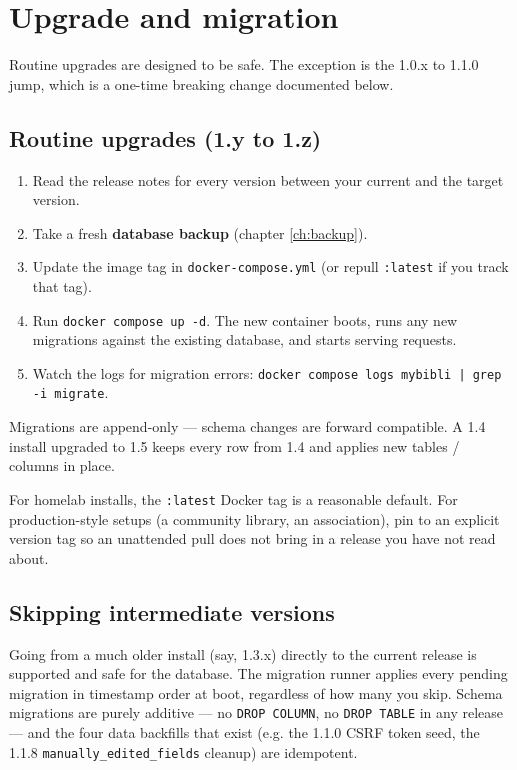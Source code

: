 \chapter{Upgrade and migration}
\label{ch:upgrade}

Routine upgrades are designed to be safe. The exception is the
1.0.x to 1.1.0 jump, which is a one-time breaking change documented
below.

\section{Routine upgrades (1.y to 1.z)}

\begin{enumerate}
  \item Read the release notes for every version between your
        current and the target version.
  \item Take a fresh \textbf{database backup} (chapter
        \ref{ch:backup}).
  \item Update the image tag in \texttt{docker-compose.yml} (or
        repull \texttt{:latest} if you track that tag).
  \item Run \texttt{docker compose up -d}. The new container boots,
        runs any new migrations against the existing database, and
        starts serving requests.
  \item Watch the logs for migration errors:
        \texttt{docker compose logs mybibli | grep -i migrate}.
\end{enumerate}

Migrations are append-only — schema changes are forward
compatible. A 1.4 install upgraded to 1.5 keeps every row from 1.4
and applies new tables / columns in place.

\begin{tip}
For homelab installs, the \texttt{:latest} Docker tag is a
reasonable default. For production-style setups (a community
library, an association), pin to an explicit version tag so an
unattended pull does not bring in a release you have not read about.
\end{tip}

\section{Skipping intermediate versions}

Going from a much older install (say, 1.3.x) directly to the
current release is supported and safe for the database. The
migration runner applies every pending migration in timestamp
order at boot, regardless of how many you skip. Schema
migrations are purely additive — no \texttt{DROP COLUMN}, no
\texttt{DROP TABLE} in any release — and the four data
backfills that exist (e.g. the 1.1.0 CSRF token seed, the
1.1.8 \texttt{manually\_edited\_fields} cleanup) are
idempotent.

